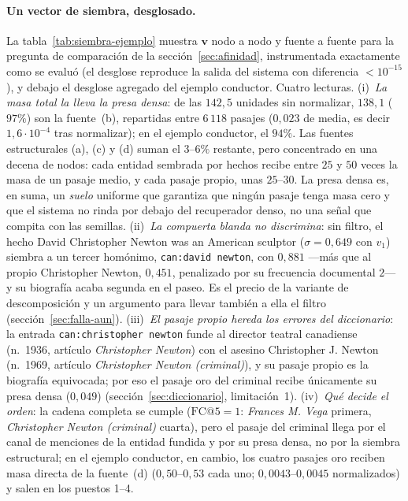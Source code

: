 \documentclass[11pt,a4paper]{article}
\begin{document}
\paragraph{Un vector de siembra, desglosado.}
La tabla~\ref{tab:siembra-ejemplo} muestra $\mathbf{v}$ nodo a nodo y
fuente a fuente para la pregunta de comparación de la
sección~\ref{sec:afinidad}, instrumentada exactamente como se evaluó (el
desglose reproduce la salida del sistema con diferencia $<10^{-15}$), y
debajo el desglose agregado del ejemplo conductor. Cuatro lecturas.
(i)~\emph{La masa total la lleva la presa densa}: de las $142{,}5$
unidades sin normalizar, $138{,}1$ ($97\%$) son la fuente~(b),
repartidas entre $6\,118$ pasajes ($0{,}023$ de media, es decir
$1{,}6\cdot10^{-4}$ tras normalizar); en el ejemplo conductor, el $94\%$.
Las fuentes estructurales (a), (c) y (d) suman el $3$--$6\%$ restante,
pero concentrado en una decena de nodos: cada entidad sembrada por hechos
recibe entre $25$ y $50$ veces la masa de un pasaje medio, y cada pasaje
propio, unas $25$--$30$. La presa densa es, en suma, un \emph{suelo}
uniforme que garantiza que ningún pasaje tenga masa cero y que el sistema
no rinda por debajo del recuperador denso, no una señal que compita con
las semillas.
(ii)~\emph{La compuerta blanda no discrimina}: sin filtro, el hecho
\guillemotleft{}David Christopher Newton was an American sculptor\guillemotright{}
($\sigma=0{,}649$ con $v_1$) siembra a un tercer homónimo,
\texttt{can:david newton}, con $0{,}881$ ---más que al propio Christopher
Newton, $0{,}451$, penalizado por su frecuencia documental $2$--- y su
biografía acaba segunda en el paseo. Es el precio de la variante de
descomposición y un argumento para llevar también a ella el filtro
(sección~\ref{sec:falla-aun}).
(iii)~\emph{El pasaje propio hereda los errores del diccionario}: la
entrada \texttt{can:christopher newton} funde al director teatral
canadiense (n.~1936, artículo \emph{Christopher Newton}) con el asesino
Christopher J. Newton (n.~1969, artículo \emph{Christopher Newton
(criminal)}), y su pasaje propio es la biografía equivocada; por eso el
pasaje oro del criminal recibe únicamente su presa densa ($0{,}049$)
(sección~\ref{sec:diccionario}, limitación~1).
(iv)~\emph{Qué decide el orden}: la cadena completa se cumple
($\mathrm{FC@}5=1$: \emph{Frances M. Vega} primera, \emph{Christopher
Newton (criminal)} cuarta), pero el pasaje del criminal llega por el
canal de menciones de la entidad fundida y por su presa densa, no por la
siembra estructural; en el ejemplo conductor, en cambio, los cuatro
pasajes oro reciben masa directa de la fuente~(d) ($0{,}50$--$0{,}53$
cada uno; $0{,}0043$--$0{,}0045$ normalizados) y salen en los puestos
1--4.
\end{document}
